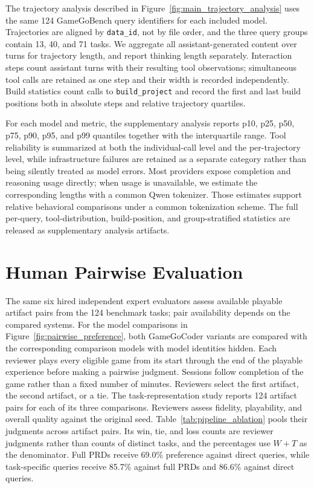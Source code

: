 \documentclass{article}
\begin{document}
The trajectory analysis described in Figure~\ref{fig:main_trajectory_analysis} uses the same 124 GameGoBench query identifiers for each included model. Trajectories are aligned by \texttt{data\_id}, not by file order, and the three query groups contain 13, 40, and 71 tasks. We aggregate all assistant-generated content over turns for trajectory length, and report thinking length separately. Interaction steps count assistant turns with their resulting tool observations; simultaneous tool calls are retained as one step and their width is recorded independently. Build statistics count calls to \texttt{build\_project} and record the first and last build positions both in absolute steps and relative trajectory quartiles.

For each model and metric, the supplementary analysis reports p10, p25, p50, p75, p90, p95, and p99 quantiles together with the interquartile range. Tool reliability is summarized at both the individual-call level and the per-trajectory level, while infrastructure failures are retained as a separate category rather than being silently treated as model errors. Most providers expose completion and reasoning usage directly; when usage is unavailable, we estimate the corresponding lengths with a common Qwen tokenizer. Those estimates support relative behavioral comparisons under a common tokenization scheme. The full per-query, tool-distribution, build-position, and group-stratified statistics are released as supplementary analysis artifacts.

\section{Human Pairwise Evaluation}
\label{app:human_evaluation}

The same six hired independent expert evaluators assess available playable artifact pairs from the 124 benchmark tasks; pair availability depends on the compared systems. For the model comparisons in Figure~\ref{fig:pairwise_preference}, both GameGoCoder variants are compared with the corresponding comparison models with model identities hidden. Each reviewer plays every eligible game from its start through the end of the playable experience before making a pairwise judgment. Sessions follow completion of the game rather than a fixed number of minutes. Reviewers select the first artifact, the second artifact, or a tie. The task-representation study reports 124 artifact pairs for each of its three comparisons. Reviewers assess fidelity, playability, and overall quality against the original seed. Table~\ref{tab:pipeline_ablation} pools their judgments across artifact pairs. Its win, tie, and loss counts are reviewer judgments rather than counts of distinct tasks, and the percentages use $W+T$ as the denominator. Full PRDs receive 69.0\% preference against direct queries, while task-specific queries receive 85.7\% against full PRDs and 86.6\% against direct queries.
\end{document}
